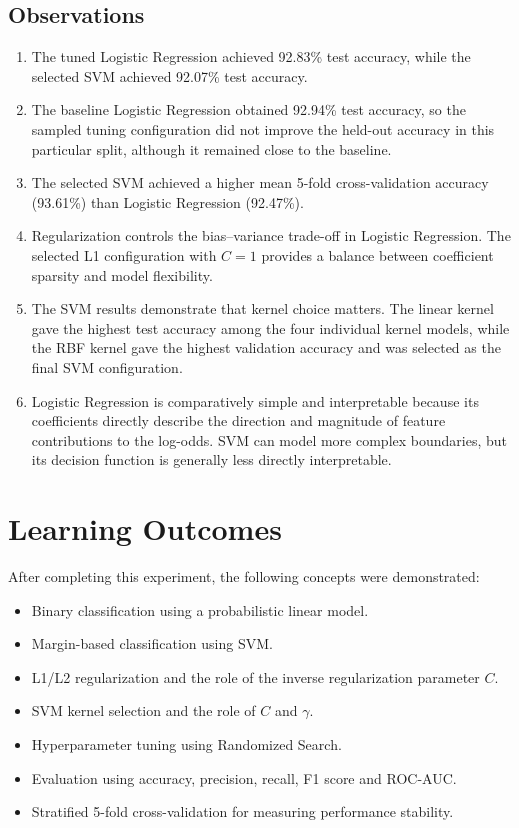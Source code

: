 \documentclass[12pt,a4paper]{article}
\begin{document}
\subsection{Observations}
\begin{enumerate}
    \item The tuned Logistic Regression achieved 92.83\% test accuracy, while the selected SVM achieved 92.07\% test accuracy.
    \item The baseline Logistic Regression obtained 92.94\% test accuracy, so the sampled tuning configuration did not improve the held-out accuracy in this particular split, although it remained close to the baseline.
    \item The selected SVM achieved a higher mean 5-fold cross-validation accuracy (93.61\%) than Logistic Regression (92.47\%).
    \item Regularization controls the bias--variance trade-off in Logistic Regression. The selected L1 configuration with $C=1$ provides a balance between coefficient sparsity and model flexibility.
    \item The SVM results demonstrate that kernel choice matters. The linear kernel gave the highest test accuracy among the four individual kernel models, while the RBF kernel gave the highest validation accuracy and was selected as the final SVM configuration.
    \item Logistic Regression is comparatively simple and interpretable because its coefficients directly describe the direction and magnitude of feature contributions to the log-odds. SVM can model more complex boundaries, but its decision function is generally less directly interpretable.
\end{enumerate}

\section{Learning Outcomes}
After completing this experiment, the following concepts were demonstrated:
\begin{itemize}
    \item Binary classification using a probabilistic linear model.
    \item Margin-based classification using SVM.
    \item L1/L2 regularization and the role of the inverse regularization parameter $C$.
    \item SVM kernel selection and the role of $C$ and $\gamma$.
    \item Hyperparameter tuning using Randomized Search.
    \item Evaluation using accuracy, precision, recall, F1 score and ROC-AUC.
    \item Stratified 5-fold cross-validation for measuring performance stability.
\end{itemize}
\end{document}

